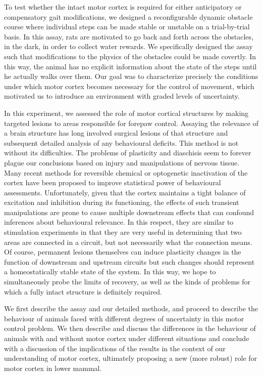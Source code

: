 To test whether the intact motor cortex is required for either anticipatory or compensatory gait modifications, we designed a reconfigurable dynamic obstacle course where individual steps can be made stable or unstable on a trial-by-trial basis. In this assay, rats are motivated to go back and forth across the obstacles, in the dark, in order to collect water rewards. We specifically designed the assay such that modifications to the physics of the obstacles could be made covertly. In this way, the animal has no explicit information about the state of the steps until he actually walks over them. Our goal was to characterize precisely the conditions under which motor cortex becomes necessary for the control of movement, which motivated us to introduce an environment with graded levels of uncertainty.

In this experiment, we assessed the role of motor cortical structures by making targeted lesions to areas responsible for forepaw control. Assaying the relevance of a brain structure has long involved surgical lesions of that structure and subsequent detailed analysis of any behavioural deficits. This method is not without its difficulties. The problems of plasticity and diaschisis seem to forever plague our conclusions based on injury and manipulations of nervous tissue. Many recent methods for reversible chemical or optogenetic inactivation of the cortex have been proposed to improve statistical power of behavioural assessments. Unfortunately, given that the cortex maintains a tight balance of excitation and inhibition during its functioning, the effects of such transient manipulations are prone to cause multiple downstream effects that can confound inferences about behavioural relevance. In this respect, they are similar to stimulation experiments in that they are very useful in determining that two areas are connected in a circuit, but not necessarily what the connection means. Of course, permanent lesions themselves can induce plasticity changes in the function of downstream and upstream circuits but such changes should represent a homeostatically stable state of the system. In this way, we hope to simultaneously probe the limits of recovery, as well as the kinds of problems for which a fully intact structure is definitely required.

We first describe the assay and our detailed methods, and proceed to describe the behaviour of animals faced with different degrees of uncertainty in this motor control problem. We then describe and discuss the differences in the behaviour of animals with and without motor cortex under different situations and conclude with a discussion of the implications of the results in the context of our understanding of motor cortex, ultimately proposing a new (more robust) role for motor cortex in lower mammal.
